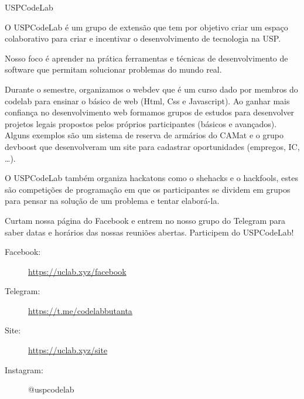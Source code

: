 \begin{subsecao}{USPCodeLab}


O USPCodeLab é um grupo de extensão que tem por objetivo criar um espaço
colaborativo para criar e incentivar o desenvolvimento de tecnologia na USP.

Nosso foco é aprender na prática ferramentas e técnicas de desenvolvimento de software que permitam
solucionar problemas do mundo real.

Durante o semestre, organizamos o webdev que é um curso dado por membros do codelab para ensinar o
básico de web (Html, Css e Javascript). Ao ganhar mais confiança no desenvolvimento web formamos
grupos de estudos para desenvolver projetos legais propostos pelos próprios participantes (básicos
e avançados). Alguns exemplos são um sistema de reserva de armários do CAMat e o grupo devboost que
desenvolveram um site para cadastrar oportunidades (empregos, IC, \dots). 

O USPCodeLab também organiza hackatons como o shehacks e o hackfools, estes são competições de
programação em que os participantes se dividem em grupos para pensar na solução de um problema e tentar
elaborá-la.

Curtam nossa página do Facebook e entrem no nosso grupo do Telegram para saber
datas e horários das nossas reuniões abertas. Participem do USPCodeLab!

\begin{description}
\item[Facebook:] \url{https://uclab.xyz/facebook}
\item[Telegram:] \url{https://t.me/codelabbutanta}
\item[Site:] \url{https://uclab.xyz/site}
\item[Instagram:] @uspcodelab
\end{description}

\end{subsecao}
